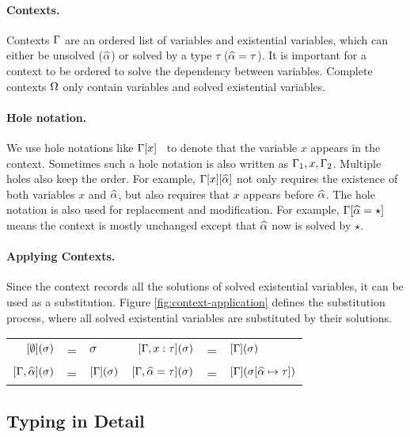 \paragraph{Contexts.}
Contexts $\Gamma$ are an ordered list of variables and
existential variables, which
can either be unsolved
($\widehat{\alpha}$) or solved by a type $\tau$ ($\widehat{\alpha} = \tau$).
It is important for a context to be ordered to solve the dependency between
variables.
Complete contexts $\Omega$ only contain variables and solved existential variables.

\paragraph{Hole notation.}
We use hole notations like $\Gamma[x]$~\citep{dunfield2013complete} to
denote that the variable $x$ appears in the context. Sometimes such a
hole notation is also written as $\Gamma_1, x, \Gamma_2$.
Multiple holes also keep the order. For example, $\Gamma[x][\widehat{\alpha}]$ not only
requires the existence of both variables $x$ and $\widehat{\alpha}$, but also requires that
$x$ appears before $\widehat{\alpha}$.
The hole notation is also used for replacement and modification. For example,
$\Gamma[\widehat{\alpha} = \star]$ means the context is mostly unchanged except
that $\widehat{\alpha}$ now is solved by $\star$.

\paragraph{Applying Contexts.} Since the context records all the solutions of
solved existential variables, it can be used as a substitution. Figure
\ref{fig:context-application} defines the substitution process, where all solved
existential variables are substituted by their solutions.

\begin{figure*}[t]
  \centering
  \begin{tabular}{rlp{2cm}rll}
    $[\emptyset](\sigma)$ & = & $\sigma$ &
    $[\Gamma, x: \tau](\sigma)$ & = & $[\Gamma](\sigma)$ \\
    $[\Gamma, \widehat{\alpha}](\sigma)$ & = & $[\Gamma](\sigma)$ &
    $[\Gamma, \widehat{\alpha} = \tau](\sigma)$ & = & $[\Gamma](\sigma [\widehat{\alpha} \mapsto \tau])$\\
  \end{tabular}
    \caption{Context application.}
    \label{fig:context-application}
\end{figure*}

\subsection{Typing in Detail}
\label{subsec:typing}

